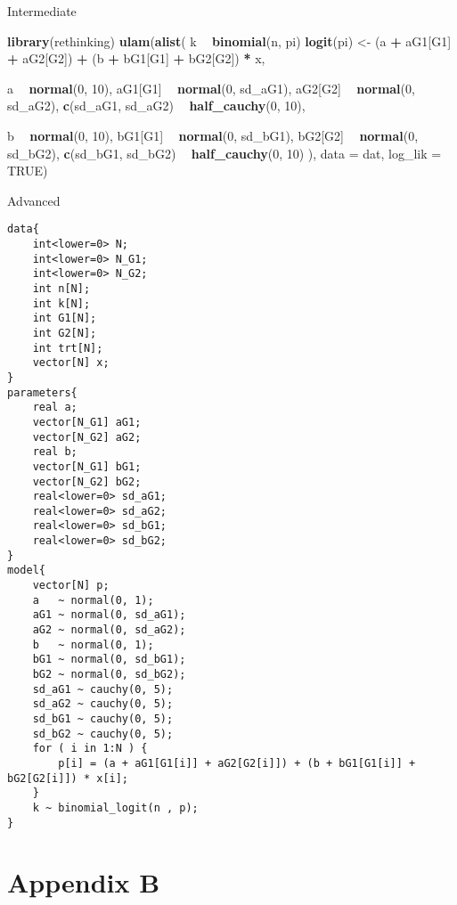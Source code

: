 \documentclass[
]{article}
\newenvironment{Shaded}{\begin{snugshade}}{\end{snugshade}}
\newcommand{\DataTypeTok}[1]{\textcolor[rgb]{0.13,0.29,0.53}{#1}}
\newcommand{\DecValTok}[1]{\textcolor[rgb]{0.00,0.00,0.81}{#1}}
\newcommand{\KeywordTok}[1]{\textcolor[rgb]{0.13,0.29,0.53}{\textbf{#1}}}
\newcommand{\NormalTok}[1]{#1}
\newcommand{\OperatorTok}[1]{\textcolor[rgb]{0.81,0.36,0.00}{\textbf{#1}}}
\newcommand{\OtherTok}[1]{\textcolor[rgb]{0.56,0.35,0.01}{#1}}
\newcommand{\StringTok}[1]{\textcolor[rgb]{0.31,0.60,0.02}{#1}}
\begin{document}
Intermediate

\begin{Shaded}
\begin{Highlighting}[]
\KeywordTok{library}\NormalTok{(rethinking)}
\KeywordTok{ulam}\NormalTok{(}\KeywordTok{alist}\NormalTok{(}
\NormalTok{  k }\OperatorTok{~}\StringTok{ }\KeywordTok{binomial}\NormalTok{(n, pi)}
  \KeywordTok{logit}\NormalTok{(pi) <-}\StringTok{ }\NormalTok{(a }\OperatorTok{+}\StringTok{ }\NormalTok{aG1[G1] }\OperatorTok{+}\StringTok{ }\NormalTok{aG2[G2]) }\OperatorTok{+}\StringTok{ }\NormalTok{(b }\OperatorTok{+}\StringTok{ }\NormalTok{bG1[G1] }\OperatorTok{+}\StringTok{ }\NormalTok{bG2[G2]) }\OperatorTok{*}\StringTok{ }\NormalTok{x,}
  
\NormalTok{  a }\OperatorTok{~}\StringTok{ }\KeywordTok{normal}\NormalTok{(}\DecValTok{0}\NormalTok{, }\DecValTok{10}\NormalTok{),}
\NormalTok{  aG1[G1] }\OperatorTok{~}\StringTok{ }\KeywordTok{normal}\NormalTok{(}\DecValTok{0}\NormalTok{, sd_aG1),}
\NormalTok{  aG2[G2] }\OperatorTok{~}\StringTok{ }\KeywordTok{normal}\NormalTok{(}\DecValTok{0}\NormalTok{, sd_aG2),}
  \KeywordTok{c}\NormalTok{(sd_aG1, sd_aG2) }\OperatorTok{~}\StringTok{ }\KeywordTok{half_cauchy}\NormalTok{(}\DecValTok{0}\NormalTok{, }\DecValTok{10}\NormalTok{),}

\NormalTok{  b }\OperatorTok{~}\StringTok{ }\KeywordTok{normal}\NormalTok{(}\DecValTok{0}\NormalTok{, }\DecValTok{10}\NormalTok{),}
\NormalTok{  bG1[G1] }\OperatorTok{~}\StringTok{ }\KeywordTok{normal}\NormalTok{(}\DecValTok{0}\NormalTok{, sd_bG1),}
\NormalTok{  bG2[G2] }\OperatorTok{~}\StringTok{ }\KeywordTok{normal}\NormalTok{(}\DecValTok{0}\NormalTok{, sd_bG2),}
  \KeywordTok{c}\NormalTok{(sd_bG1, sd_bG2) }\OperatorTok{~}\StringTok{ }\KeywordTok{half_cauchy}\NormalTok{(}\DecValTok{0}\NormalTok{, }\DecValTok{10}\NormalTok{)}
\NormalTok{), }\DataTypeTok{data =}\NormalTok{ dat, }\DataTypeTok{log_lik =} \OtherTok{TRUE}\NormalTok{)}
\end{Highlighting}
\end{Shaded}

Advanced

\begin{verbatim}
data{
    int<lower=0> N;
    int<lower=0> N_G1;
    int<lower=0> N_G2;
    int n[N];
    int k[N];
    int G1[N];
    int G2[N];
    int trt[N];
    vector[N] x;
}
parameters{
    real a;
    vector[N_G1] aG1;
    vector[N_G2] aG2;
    real b;
    vector[N_G1] bG1;
    vector[N_G2] bG2;
    real<lower=0> sd_aG1;
    real<lower=0> sd_aG2;
    real<lower=0> sd_bG1;
    real<lower=0> sd_bG2;
}
model{
    vector[N] p;
    a   ~ normal(0, 1);
    aG1 ~ normal(0, sd_aG1);
    aG2 ~ normal(0, sd_aG2);
    b   ~ normal(0, 1);
    bG1 ~ normal(0, sd_bG1);
    bG2 ~ normal(0, sd_bG2);
    sd_aG1 ~ cauchy(0, 5);
    sd_aG2 ~ cauchy(0, 5);
    sd_bG1 ~ cauchy(0, 5);
    sd_bG2 ~ cauchy(0, 5);
    for ( i in 1:N ) {
        p[i] = (a + aG1[G1[i]] + aG2[G2[i]]) + (b + bG1[G1[i]] + bG2[G2[i]]) * x[i];
    }
    k ~ binomial_logit(n , p);
}
\end{verbatim}

\hypertarget{appendix-b}{%
\section*{Appendix B}\label{appendix-b}}


  
\end{document}
